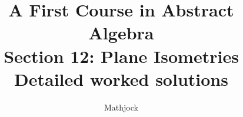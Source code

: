 
\title{\textbf{A First Course in Abstract Algebra}\\[0.3em]Section 12: Plane Isometries\\[0.3em]\large Detailed worked solutions}
\author{Mathjock}
\date{}

\maketitle
\bookinfo
\tableofcontents
\clearpage
\renewcommand{\thesection}{12}
\renewcommand{\theHsection}{fraleigh.12}


